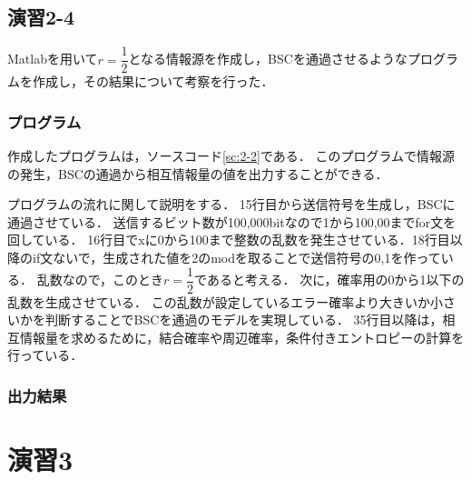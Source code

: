 \documentclass[documentclass]{jsarticle}
\begin{document}
\subsection*{演習2-4}
Matlabを用いて$r = \dfrac{1}{2}$となる情報源を作成し，BSCを通過させるようなプログラムを作成し，その結果について考察を行った．

\subsubsection*{プログラム}
作成したプログラムは，ソースコード\ref*{sc:2-2}である．
このプログラムで情報源の発生，BSCの通過から相互情報量の値を出力することができる．

プログラムの流れに関して説明をする．
15行目から送信符号を生成し，BSCに通過させている．
送信するビット数が100,000bitなので1から100,00までfor文を回している．
16行目でxに0から100まで整数の乱数を発生させている．18行目以降のif文ないで，生成された値を2のmodを取ることで送信符号の0,1を作っている．
乱数なので，このとき$r = \dfrac{1}{2}$であると考える．
次に，確率用の0から1以下の乱数を生成させている．
この乱数が設定しているエラー確率より大きいか小さいかを判断することでBSCを通過のモデルを実現している．
35行目以降は，相互情報量を求めるために，結合確率や周辺確率，条件付きエントロピーの計算を行っている．



\subsubsection*{出力結果}

\newpage

\section*{演習3}
\end{document}
